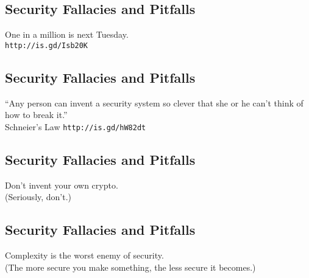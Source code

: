 \documentclass[xga]{xdvislides}
\begin{document}
\subsection{Security Fallacies and Pitfalls}
\vspace*{\fill}
\begin{center}
    \Hugesize
        One in a million is next Tuesday. \\
	\vspace{.25in}
	\Normalsize
	\verb+http://is.gd/Isb20K+
\end{center}
\vspace*{\fill}

\subsection{Security Fallacies and Pitfalls}
\vspace*{\fill}
\begin{center}
    \Hugesize
        ``Any person can invent a security system so clever that she or he
can't think of how to break it.'' \\
	\vspace{.25in}
	\Normalsize
	Schneier's Law \verb+http://is.gd/hW82dt+
\end{center}
\vspace*{\fill}

\subsection{Security Fallacies and Pitfalls}
\vspace*{\fill}
\begin{center}
    \Hugesize
        Don't invent your own crypto. \\
	\vspace{.25in}
	\Normalsize
	(Seriously, don't.)
\end{center}
\vspace*{\fill}

\subsection{Security Fallacies and Pitfalls}
\vspace*{\fill}
\begin{center}
    \Hugesize
	Complexity is the worst enemy of security. \\
	\vspace{.25in}
	\Normalsize
	(The more secure you make something, the less secure it becomes.)
\end{center}
\vspace*{\fill}
\end{document}
